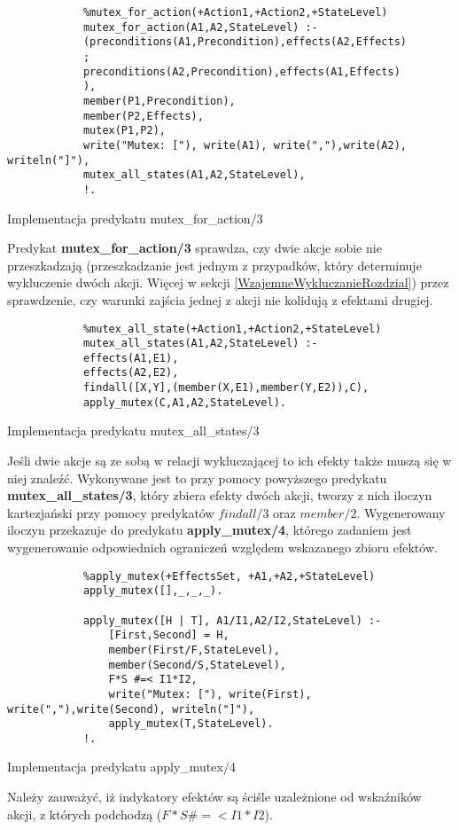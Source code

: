     \begin{listing}[H]
        \begin{verbatim}
            %mutex_for_action(+Action1,+Action2,+StateLevel)
            mutex_for_action(A1,A2,StateLevel) :-
            (preconditions(A1,Precondition),effects(A2,Effects)
            ;
            preconditions(A2,Precondition),effects(A1,Effects)
            ),
            member(P1,Precondition),
            member(P2,Effects),
            mutex(P1,P2),
            write("Mutex: ["), write(A1), write(","),write(A2), writeln("]"),
            mutex_all_states(A1,A2,StateLevel),
            !.
    \end{verbatim}
    \caption{Implementacja predykatu mutex\_for\_action/3}
    \end{listing}

    Predykat \textbf{mutex\_for\_action/3} sprawdza, czy dwie akcje sobie nie przeszkadzają (przeszkadzanie jest jednym z przypadków, który determinuje 
    wykluczenie dwóch akcji. Więcej w sekcji \ref{WzajemneWykluczanieRozdzial}) przez sprawdzenie, czy warunki zajścia jednej z akcji nie kolidują 
    z efektami drugiej.
    \begin{listing}[H]
        \begin{verbatim}
            %mutex_all_state(+Action1,+Action2,+StateLevel)
            mutex_all_states(A1,A2,StateLevel) :-
            effects(A1,E1),
            effects(A2,E2),
            findall([X,Y],(member(X,E1),member(Y,E2)),C),
            apply_mutex(C,A1,A2,StateLevel).
    \end{verbatim}
    \caption{Implementacja predykatu mutex\_all\_states/3}
    \end{listing}
    Jeśli dwie akcje są ze sobą w relacji wykluczającej to ich efekty także muszą się w niej znaleźć. Wykonywane jest to przy pomocy powyższego 
    predykatu \textbf{mutex\_all\_states/3}, który zbiera efekty dwóch akcji, tworzy z nich iloczyn kartezjański przy pomocy predykatów 
    $findall/3$ oraz $member/2$. Wygenerowany iloczyn przekazuje do predykatu \textbf{apply\_mutex/4}, którego zadaniem jest wygenerowanie 
    odpowiednich ograniczeń względem wskazanego zbioru efektów.

    \begin{listing}[H]
        \begin{verbatim}
            %apply_mutex(+EffectsSet, +A1,+A2,+StateLevel)
            apply_mutex([],_,_,_).

            apply_mutex([H | T], A1/I1,A2/I2,StateLevel) :-
                [First,Second] = H, 
                member(First/F,StateLevel),
                member(Second/S,StateLevel),
                F*S #=< I1*I2,
                write("Mutex: ["), write(First), write(","),write(Second), writeln("]"),
                apply_mutex(T,StateLevel).
            !.
    \end{verbatim}
    \caption{Implementacja predykatu apply\_mutex/4}
    \end{listing}
    Należy zauważyć, iż indykatory efektów są ściśle uzależnione od wskaźników akcji, z których podchodzą ($F*S \#=< I1*I2$).


